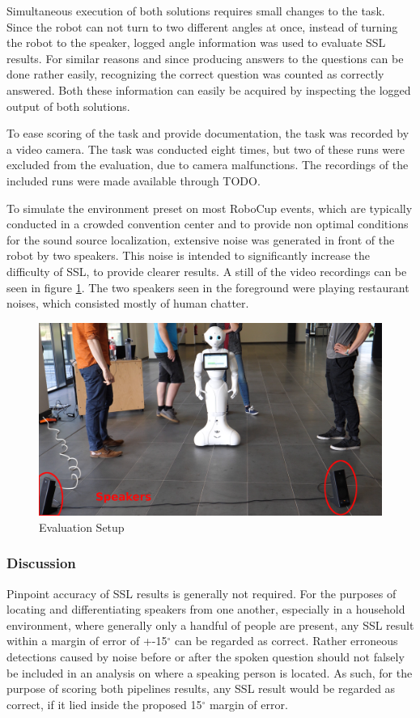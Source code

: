 Simultaneous execution of both solutions requires small changes to the task.
Since the robot can not turn to two different angles at once, instead of turning the robot to the speaker, logged angle information was used to evaluate SSL results.
For similar reasons and since producing answers to the questions can be done rather easily, recognizing the correct question was counted as correctly answered.
Both these information can easily be acquired by inspecting the logged output of both solutions.

To ease scoring of the task and provide documentation, the task was recorded by a video camera.
The task was conducted eight times, but two of these runs were excluded from the evaluation, due to camera malfunctions.
The recordings of the included runs were made available through TODO.

To simulate the environment preset on most RoboCup events, which are typically conducted in a crowded convention center and to provide non optimal conditions for the sound source localization, extensive noise was generated in front of the robot by two speakers.
This noise is intended to significantly increase the difficulty of SSL, to provide clearer results.
A still of the video recordings can be seen in figure \ref{pic:eval_task_setup_pepper}.
The two speakers seen in the foreground were playing restaurant noises, which consisted mostly of human chatter.

\begin{figure}[]
	\centering
	\includegraphics[width=\textwidth]{bilder/eval/pepper_task_setup.png}
	\caption{Evaluation Setup}
	\label{pic:eval_task_setup_pepper}
\end{figure}

\subsubsection{Discussion}
Pinpoint accuracy of SSL results is generally not required.
For the purposes of locating and differentiating speakers from one another, especially in a household environment, where generally only a handful of people are present, any SSL result within a margin of error of +-15$^\circ$ can be regarded as correct.
Rather erroneous detections caused by noise before or after the spoken question should not falsely be included in an analysis on where a speaking person is located.
As such, for the purpose of scoring both pipelines results, any SSL result would be regarded as correct, if it lied inside the proposed 15$^\circ$ margin of error.

